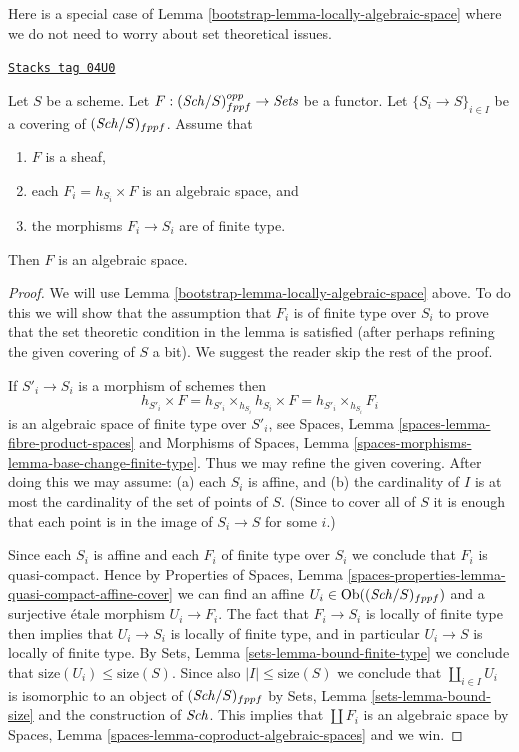 Here is a special case of Lemma \ref{bootstrap-lemma-locally-algebraic-space}
where we do not need to worry about set theoretical issues.

\begin{lemma}
\label{bootstrap-lemma-locally-algebraic-space-finite-type}
\href{https://stacks.math.columbia.edu/tag/04U0}{\texttt{Stacks tag 04U0}}

Let $S$ be a scheme.
Let $F : (\mathit{Sch}/S)_{fppf}^{opp} \to \textit{Sets}$ be a functor.
Let $\{S_i \to S\}_{i \in I}$ be a covering of $(\mathit{Sch}/S)_{fppf}$.
Assume that
\begin{enumerate}
\item $F$ is a sheaf,
\item each $F_i = h_{S_i} \times F$ is an algebraic space, and
\item the morphisms $F_i \to S_i$ are of finite type.
\end{enumerate}
Then $F$ is an algebraic space.
\end{lemma}

\begin{proof}

We will use
Lemma \ref{bootstrap-lemma-locally-algebraic-space}
above. To do this we will show that the assumption that
$F_i$ is of finite type over $S_i$ to prove that the set theoretic
condition in the lemma is satisfied (after perhaps refining the given
covering of $S$ a bit).
We suggest the reader skip the rest of the proof.

\medskip\noindent
If $S'_i \to S_i$ is a morphism of schemes then
$$
h_{S'_i} \times F =
h_{S'_i} \times_{h_{S_i}} h_{S_i} \times F =
h_{S'_i} \times_{h_{S_i}} F_i
$$
is an algebraic space of finite type over $S'_i$, see
Spaces, Lemma \ref{spaces-lemma-fibre-product-spaces}
and
Morphisms of Spaces,
Lemma \ref{spaces-morphisms-lemma-base-change-finite-type}.
Thus we may refine the given covering. After doing this we may assume:
(a) each $S_i$ is affine, and (b) the cardinality of $I$ is at most
the cardinality of the set of points of $S$. (Since to cover
all of $S$ it is enough that each point is in the image of $S_i \to S$
for some $i$.)

\medskip\noindent
Since each $S_i$ is affine and each $F_i$ of finite type over $S_i$
we conclude that $F_i$ is quasi-compact. Hence by
Properties of Spaces,
Lemma \ref{spaces-properties-lemma-quasi-compact-affine-cover}
we can find an affine $U_i \in \operatorname{Ob}((\mathit{Sch}/S)_{fppf})$
and a surjective \'etale morphism $U_i \to F_i$. The fact that
$F_i \to S_i$ is locally of finite type then implies that
$U_i \to S_i$ is locally of finite type, and in particular
$U_i \to S$ is locally of finite type. By
Sets, Lemma \ref{sets-lemma-bound-finite-type}
we conclude that $\text{size}(U_i) \leq \text{size}(S)$.
Since also $|I| \leq \text{size}(S)$ we conclude that
$\coprod_{i \in I} U_i$ is isomorphic to an object of
$(\mathit{Sch}/S)_{fppf}$ by
Sets, Lemma \ref{sets-lemma-bound-size}
and the construction of $\mathit{Sch}$. This implies that
$\coprod F_i$ is an algebraic space by
Spaces, Lemma \ref{spaces-lemma-coproduct-algebraic-spaces}
and we win.
\end{proof}


